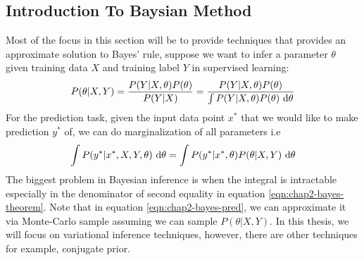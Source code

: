 \label{sec:chap2-prob-ml}

\subsection{Introduction To Baysian Method}
\label{sec:chap2-intro-baysian}
Most of the focus in this section will be to provide techniques that provides an approximate solution to Bayes' rule, suppose we want to infer a parameter $\theta$ given training data $X$ and training label $Y$ in supervised learning: 
\begin{equation}
    \label{eqn:chap2-bayes-theorem}
    P(\theta | X, Y) = \frac{P(Y | X, \theta) P(\theta)}{P(Y | X)} = \frac{P(Y | X, \theta) P(\theta)}{\int P(Y | X, \theta) P(\theta ) \ \mathrm{d} \theta}
\end{equation}
For the prediction task, given the input data point $x^*$ that we would like to make prediction $y^*$ of, we can do marginalization of all parameters i.e
\begin{equation}
    \label{eqn:chap2-bayes-pred}
    \int P(y^* | x^*, X, Y, \theta) \ \mathrm{d}\theta = \int P(y^* | x^*, \theta) P(\theta | X, Y) \ \mathrm{d}\theta
\end{equation}
The biggest problem in Bayesian inference is when the integral is intractable especially in the denominator of second equality in equation \ref{eqn:chap2-bayes-theorem}. Note that in equation \ref{eqn:chap2-bayes-pred}, we can approximate it via Monte-Carlo sample assuming we can sample $P(\theta | X, Y)$. In this thesis, we will focus on variational inference techniques, however, there are other techniques for example, conjugate prior.

